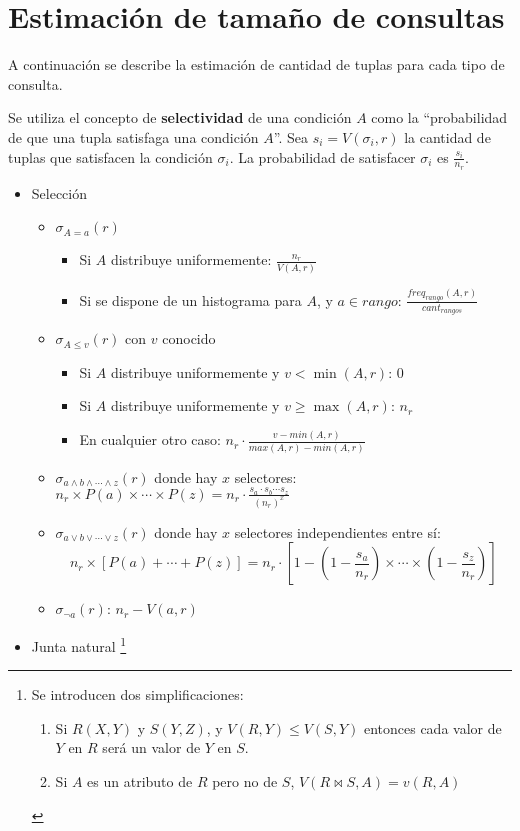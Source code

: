 \documentclass[a4paper, twoside]{article}
\begin{document}
\section{Estimación de tamaño de consultas}

A continuación se describe la estimación de cantidad de tuplas para
cada tipo de consulta. 

Se utiliza el concepto de \textbf{selectividad} de una condición $A$
como la ``probabilidad de que una tupla satisfaga una condición $A$''.
Sea $s_{i}=V(\sigma_{i},r)$ la cantidad de tuplas que satisfacen
la condición $\sigma_{i}$. La probabilidad de satisfacer $\sigma_{i}$
es $\frac{s_{i}}{n_{r}}$.
\begin{itemize}
\item Selección

\begin{itemize}
\item $\sigma_{A=a}(r)$

\begin{itemize}
\item Si $A$ distribuye uniformemente: $\frac{n_{r}}{V(A,r)}$
\item Si se dispone de un histograma para $A$, y $a\in rango$: $\frac{freq_{rango}(A,r)}{cant_{rangos}}$
\end{itemize}
\item $\sigma_{A\leq v}(r)$ con $v$ conocido

\begin{itemize}
\item Si $A$ distribuye uniformemente y $v<\min(A,r)$: $0$
\item Si $A$ distribuye uniformemente y $v\geq\max(A,r)$: $n_{r}$
\item En cualquier otro caso: $n_{r}\cdot\frac{v-min(A,r)}{max(A,r)-min(A,r)}$
\end{itemize}
\item $\sigma_{a\wedge b\wedge\cdots\wedge z}(r)$ donde hay $x$ selectores:
$n_{r}\times P(a)\times\cdots\times P(z)=n_{r}\cdot\frac{s_{a}\cdot s_{b}\cdots s_{z}}{\left(n_{r}\right)^{x}}$
\item $\sigma_{a\lor b\lor\cdots\lor z}(r)$ donde hay $x$ selectores independientes
entre sí: 
\[
n_{r}\times\left[P(a)+\cdots+P(z)\right]=n_{r}\cdot\left[1-\left(1-\frac{s_{a}}{n_{r}}\right)\times\cdots\times\left(1-\frac{s_{z}}{n_{r}}\right)\right]
\]

\item $\sigma_{\lnot a}(r)$: $n_{r}-V(a,r)$
\end{itemize}
\item Junta natural%
\footnote{Se introducen dos simplificaciones:
\begin{enumerate}
\item Si $R(X,Y)$ y $S(Y,Z)$, y $V(R,Y)\leq V(S,Y)$ entonces cada valor
de $Y$ en $R$ será un valor de $Y$ en $S$.
\item Si $A$ es un atributo de $R$ pero no de $S$, $V\left(R\bowtie S,A\right)=v\left(R,A\right)$\end{enumerate}
%
}


\end{itemize}
\end{document}
